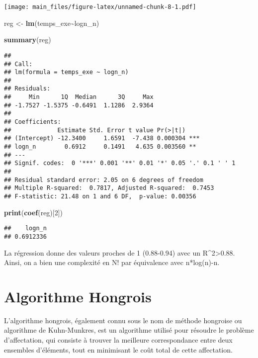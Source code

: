 \documentclass[
]{article}
\newenvironment{Shaded}{\begin{snugshade}}{\end{snugshade}}
\newcommand{\DecValTok}[1]{\textcolor[rgb]{0.00,0.00,0.81}{#1}}
\newcommand{\FunctionTok}[1]{\textcolor[rgb]{0.13,0.29,0.53}{\textbf{#1}}}
\newcommand{\NormalTok}[1]{#1}
\newcommand{\OtherTok}[1]{\textcolor[rgb]{0.56,0.35,0.01}{#1}}
\newcommand{\SpecialCharTok}[1]{\textcolor[rgb]{0.81,0.36,0.00}{\textbf{#1}}}
\begin{document}
\texttt{[image: main\_files/figure-latex/unnamed-chunk-8-1.pdf]}

\begin{Shaded}
\begin{Highlighting}[]
\NormalTok{reg }\OtherTok{\textless{}{-}} \FunctionTok{lm}\NormalTok{(temps\_exe}\SpecialCharTok{\textasciitilde{}}\NormalTok{logn\_n)}

\FunctionTok{summary}\NormalTok{(reg)}
\end{Highlighting}
\end{Shaded}

\begin{verbatim}
## 
## Call:
## lm(formula = temps_exe ~ logn_n)
## 
## Residuals:
##     Min      1Q  Median      3Q     Max 
## -1.7527 -1.5375 -0.6491  1.1286  2.9364 
## 
## Coefficients:
##             Estimate Std. Error t value Pr(>|t|)    
## (Intercept) -12.3400     1.6591  -7.438 0.000304 ***
## logn_n        0.6912     0.1491   4.635 0.003560 ** 
## ---
## Signif. codes:  0 '***' 0.001 '**' 0.01 '*' 0.05 '.' 0.1 ' ' 1
## 
## Residual standard error: 2.05 on 6 degrees of freedom
## Multiple R-squared:  0.7817, Adjusted R-squared:  0.7453 
## F-statistic: 21.48 on 1 and 6 DF,  p-value: 0.00356
\end{verbatim}

\begin{Shaded}
\begin{Highlighting}[]
\FunctionTok{print}\NormalTok{(}\FunctionTok{coef}\NormalTok{(reg)[}\DecValTok{2}\NormalTok{])}
\end{Highlighting}
\end{Shaded}

\begin{verbatim}
##    logn_n 
## 0.6912336
\end{verbatim}

La régression donne des valeurs proches de 1 (0.88-0.94) avec un
R\^{}2\textgreater0.88. Ainsi, on a bien une complexité en N! par
équivalence avec n*log(n)-n.~

\hypertarget{algorithme-hongrois}{%
\section{Algorithme Hongrois}\label{algorithme-hongrois}}

L'algorithme hongrois, également connu sous le nom de méthode hongroise
ou algorithme de Kuhn-Munkres, est un algorithme utilisé pour résoudre
le problème d'affectation, qui consiste à trouver la meilleure
correspondance entre deux ensembles d'éléments, tout en minimisant le
coût total de cette affectation.
\end{document}
